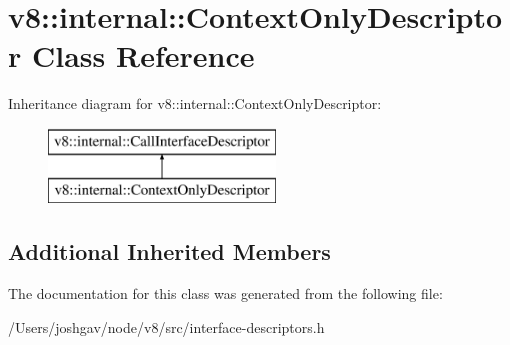 \hypertarget{classv8_1_1internal_1_1_context_only_descriptor}{}\section{v8\+:\+:internal\+:\+:Context\+Only\+Descriptor Class Reference}
\label{classv8_1_1internal_1_1_context_only_descriptor}
Inheritance diagram for v8\+:\+:internal\+:\+:Context\+Only\+Descriptor\+:\begin{figure}[H]
\begin{center}
\leavevmode
\includegraphics[height=2.000000cm]{classv8_1_1internal_1_1_context_only_descriptor}
\end{center}
\end{figure}
\subsection*{Additional Inherited Members}


The documentation for this class was generated from the following file\+:\begin{DoxyCompactItemize}
\item 
/\+Users/joshgav/node/v8/src/interface-\/descriptors.\+h\end{DoxyCompactItemize}
